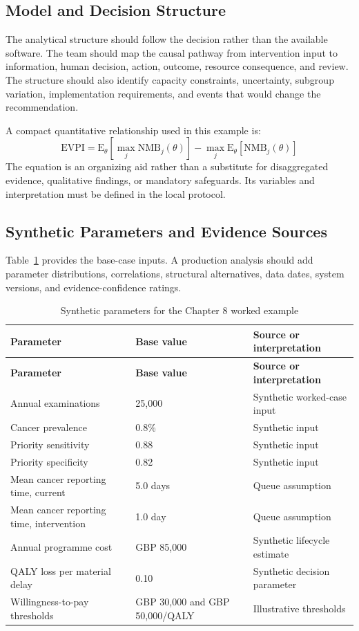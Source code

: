 \subsection{Model and Decision Structure}
The analytical structure should follow the decision rather than the available
software. The team should map the causal pathway from intervention input to
information, human decision, action, outcome, resource consequence, and review.
The structure should also identify capacity constraints, uncertainty, subgroup
variation, implementation requirements, and events that would change the
recommendation.

A compact quantitative relationship used in this example is:
\begin{equation}
\mathrm{EVPI}=\mathrm{E}_{\theta}[\max_j \mathrm{NMB}_j(\theta)]-\max_j\mathrm{E}_{\theta}[\mathrm{NMB}_j(\theta)]
\label{eq:comp-ch08-key-relationship}
\end{equation}
The equation is an organizing aid rather than a substitute for disaggregated evidence,
qualitative findings, or mandatory safeguards. Its variables and interpretation must
be defined in the local protocol.

\subsection{Synthetic Parameters and Evidence Sources}
Table~\ref{tab:comp-ch08-parameters} provides the base-case inputs. A
production analysis should add parameter distributions, correlations, structural
alternatives, data dates, system versions, and evidence-confidence ratings.

\begin{longtable}{@{}p{}p{}p{}@{}}
\caption{Synthetic parameters for the Chapter 8 worked example}
\label{tab:comp-ch08-parameters}\\
\toprule
\textbf{Parameter} & \textbf{Base value} & \textbf{Source or interpretation} \\
\midrule
\endfirsthead
\toprule
\textbf{Parameter} & \textbf{Base value} & \textbf{Source or interpretation} \\
\midrule
\endhead
\bottomrule
\endlastfoot
Annual examinations & 25,000 & Synthetic worked-case input \\
Cancer prevalence & 0.8\% & Synthetic input \\
Priority sensitivity & 0.88 & Synthetic input \\
Priority specificity & 0.82 & Synthetic input \\
Mean cancer reporting time, current & 5.0 days & Queue assumption \\
Mean cancer reporting time, intervention & 1.0 day & Queue assumption \\
Annual programme cost & GBP 85,000 & Synthetic lifecycle estimate \\
QALY loss per material delay & 0.10 & Synthetic decision parameter \\
Willingness-to-pay thresholds & GBP 30,000 and GBP 50,000/QALY & Illustrative thresholds \\
\end{longtable}

